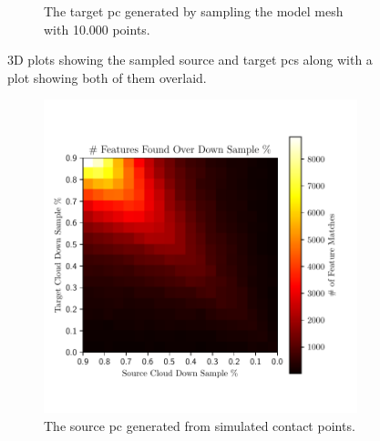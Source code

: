 \begin{figure}[!h]
\begin{subfigure}[b]{0.48\textwidth}
		\caption{The target \gls{pc} generated by sampling the model mesh with \num{10,000} points.}
		\label{fig:pe-feature-unfiltered-pc}
	\end{subfigure}
	\caption{3D plots showing the sampled source and target \gls{pc}s along with a plot showing both of them overlaid.}
	\label{fig:pe-filture-and-unfiltered-pc}
\end{figure}




\begin{figure}[!h]
	\centering
	\begin{subfigure}[b]{0.48\textwidth}
		\centering
		\includegraphics[width=\textwidth]{chapters/2-pose-estimation/fig/M.pdf}
		\caption{The source \gls{pc} generated from simulated contact points.\newline}
		\label{fig:pe-feature-filtered-pc}
	\end{subfigure}
	\begin{subfigure}[b]{0.48\textwidth}
		\centering

\end{subfigure}
\end{figure}
